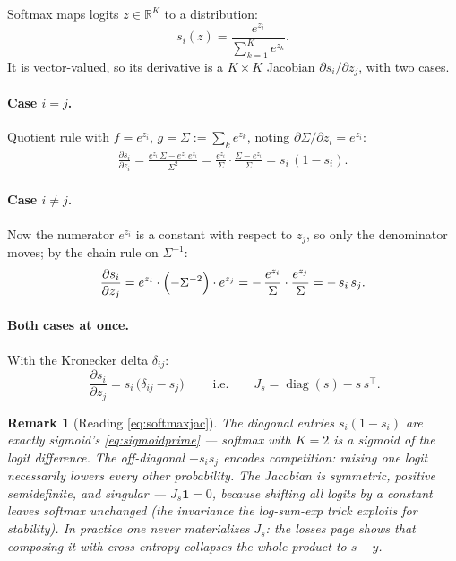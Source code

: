 \documentclass[11pt]{article}
\newtheorem{remark}{Remark}
\begin{document}
Softmax maps logits $z \in \mathbb{R}^{K}$ to a distribution:
\begin{equation}
  s_i(z) = \frac{e^{z_i}}{\sum_{k=1}^{K} e^{z_k}}.
  \label{eq:softmax}
\end{equation}
It is vector-valued, so its derivative is a $K \times K$ Jacobian
$\partial s_i / \partial z_j$, with two cases.

\paragraph{Case $i = j$.} Quotient rule with $f = e^{z_i}$,
$g = \Sigma := \sum_k e^{z_k}$, noting
$\partial \Sigma / \partial z_i = e^{z_i}$:
\begin{align*}
  \frac{\partial s_i}{\partial z_i}
  = \frac{e^{z_i}\,\Sigma - e^{z_i}\,e^{z_i}}{\Sigma^{2}}
  = \frac{e^{z_i}}{\Sigma}\cdot\frac{\Sigma - e^{z_i}}{\Sigma}
  = s_i\,(1 - s_i).
\end{align*}

\paragraph{Case $i \ne j$.} Now the numerator $e^{z_i}$ is a constant
with respect to $z_j$, so only the denominator moves; by the chain rule
on $\Sigma^{-1}$:
\begin{align*}
  \frac{\partial s_i}{\partial z_j}
  = e^{z_i} \cdot \Bigl(-\Sigma^{-2}\Bigr)\cdot e^{z_j}
  = -\,\frac{e^{z_i}}{\Sigma}\cdot\frac{e^{z_j}}{\Sigma}
  = -\,s_i\,s_j.
\end{align*}

\paragraph{Both cases at once.} With the Kronecker delta
$\delta_{ij}$:
\begin{equation}
  \boxed{\;\frac{\partial s_i}{\partial z_j}
  = s_i\,\bigl(\delta_{ij} - s_j\bigr)\;}
  \qquad\text{i.e.}\qquad
  J_s = \operatorname{diag}(s) - s\,s^{\top}.
  \label{eq:softmaxjac}
\end{equation}

\begin{remark}[Reading \eqref{eq:softmaxjac}]
The diagonal entries $s_i(1-s_i)$ are exactly sigmoid's
\eqref{eq:sigmoidprime} --- softmax with $K=2$ \emph{is} a sigmoid of
the logit difference. The off-diagonal $-s_i s_j$ encodes competition:
raising one logit necessarily lowers every other probability. The
Jacobian is symmetric, positive semidefinite, and singular ---
$J_s \mathbf{1} = 0$, because shifting all logits by a constant leaves
softmax unchanged (the invariance the log-sum-exp trick exploits for
stability). In practice one never materializes $J_s$: the losses page
shows that composing it with cross-entropy collapses the whole product
to $s - y$.
\end{remark}
\end{document}

